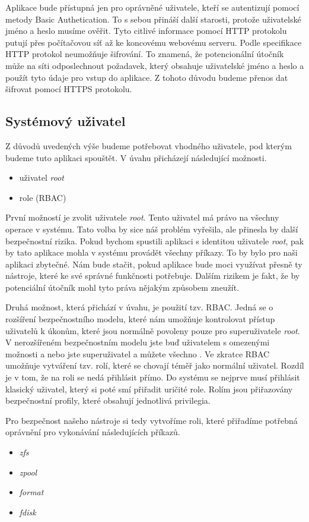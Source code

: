 Aplikace bude přístupná jen pro oprávněné uživatele, kteří se autentizují pomocí metody Basic Authetication. To s sebou přináší další starosti, protože uživatelské jméno a heslo musíme ověřit. Tyto citlivé informace pomocí HTTP protokolu putují přes počítačovou síť až ke koncovému webovému serveru. Podle specifikace \cite{RFC2616} HTTP protokol neumožňuje šifrování. To znamená, že potencionální útočník může na síti odposlechnout požadavek, který obsahuje uživatelské jméno a heslo a použít tyto údaje pro vstup do aplikace. Z tohoto důvodu budeme přenos dat šifrovat pomocí HTTPS protokolu.
    \subsection{Systémový uživatel}
    \label{sysuser}
    Z důvodů uvedených výše budeme potřebovat vhodného uživatele, pod kterým budeme tuto aplikaci spouštět. V úvahu přicházejí následující možnosti.
    \begin{itemize}
      \item uživatel \emph{root}
      \item role (RBAC)
    \end{itemize}

    První možností je zvolit uživatele \emph{root}. Tento uživatel má právo na všechny operace v systému. Tato volba by sice náš problém vyřešila, ale přinesla by další bezpečnostní rizika. Pokud bychom spustili aplikaci s identitou uživatele \emph{root}, pak by tato aplikace mohla v systému provádět všechny příkazy. To by bylo pro naši aplikaci zbytečné. Nám bude stačit, pokud aplikace bude moci využívat přesně ty nástroje, které ke své správné funkčnosti potřebuje. Dalším rizikem je fakt, že by potenciální útočník mohl tyto práva nějakým způsobem zneužít.

    Druhá možnost, která přichází v úvahu, je použití tzv. RBAC. Jedná se o rozšíření bezpečnostního modelu, které nám umožňuje kontrolovat přístup uživatelů k úkonům, které jsou normálně povoleny pouze pro superuživatele \emph{root}. V nerozšířeném bezpečnostním modelu jste buď uživatelem s omezenými možnosti a nebo jste superuživatel a můžete všechno \cite{RBAC}. Ve zkratce RBAC umožňuje vytváření tzv. rolí, které se chovají téměř jako normální uživatel. Rozdíl je v tom, že na roli se nedá přihlásit přímo. Do systému se nejprve musí přihlásit klasický uživatel, který si poté smí přiřadit uričité role. Rolím jsou přiřazovány bezpečnostní profily, které obsahují jednotlivá privilegia.

    Pro bezpečnost našeho nástroje si tedy vytvoříme roli, které přiřadíme potřebná oprávnění pro vykonávání následujících příkazů.
    \begin{itemize}
      \item \emph{zfs}
      \item \emph{zpool}
      \item \emph{format}
      \item \emph{fdisk}
    \end{itemize}

